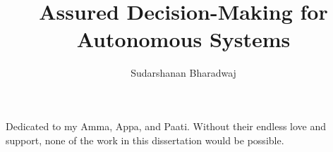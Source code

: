 \documentclass[12pt,twosided,openright]{report}	%
\author{Sudarshanan Bharadwaj}  	%
\title{Assured Decision-Making for Autonomous Systems}
\theoremstyle{definition}
\theoremstyle{remark}
\begin{document}
\copyrightpage          %


%
%
%
\commcertpage           %

\titlepage              %



%
\begin{dedication}
%
Dedicated to my Amma, Appa, and Paati. Without their endless love and support, none of the work in this dissertation would be possible.
\end{dedication}
\end{document}

